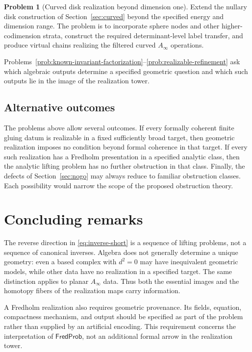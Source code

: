\documentclass[11pt,letterpaper,twoside]{article}
\theoremstyle{plain}
\theoremstyle{definition}
\newtheorem{problem}[theorem]{Problem}
\theoremstyle{remark}
\newcommand{\FredProb}{\mathsf{FredProb}}
\newcommand{\Ainf}{A_\infty}
\begin{document}
\begin{problem}[Curved disk realization beyond dimension one]\label{prob:curved-higher}
Extend the nullary disk construction of Section~\ref{sec:curved} beyond the specified energy and dimension range.  The problem is to incorporate sphere nodes and other higher-codimension strata, construct the required determinant-level label transfer, and produce virtual chains realizing the filtered curved \(\Ainf\) operations.
\end{problem}

Problems~\ref{prob:known-invariant-factorization}--\ref{prob:realizable-refinement} ask which algebraic outputs determine a specified geometric question and which such outputs lie in the image of the realization tower.

\subsection{Alternative outcomes}

The problems above allow several outcomes.  If every formally coherent finite gluing datum is realizable in a fixed sufficiently broad target, then geometric realization imposes no condition beyond formal coherence in that target.  If every such realization has a Fredholm presentation in a specified analytic class, then the analytic lifting problem has no further obstruction in that class.  Finally, the defects of Section~\ref{sec:nogo} may always reduce to familiar obstruction classes.  Each possibility would narrow the scope of the proposed obstruction theory.

\section{Concluding remarks}\label{sec:conclusion}

The reverse direction in \eqref{eq:inverse-short} is a sequence of lifting problems, not a sequence of canonical inverses.  Algebra does not generally determine a unique geometry: even a based complex with \(d^2=0\) may have inequivalent geometric models, while other data have no realization in a specified target.  The same distinction applies to planar \(\Ainf\) data.  Thus both the essential images and the homotopy fibers of the realization maps carry information.

A Fredholm realization also requires geometric provenance.  Its fields, equation, compactness mechanism, and output should be specified as part of the problem rather than supplied by an artificial encoding.  This requirement concerns the interpretation of \(\FredProb\), not an additional formal arrow in the realization tower.
\end{document}
